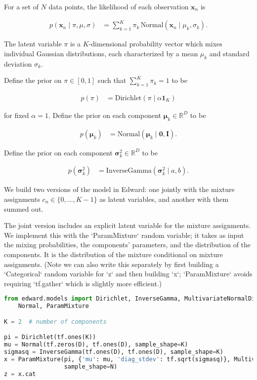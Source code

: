 For a set of $N$ data points,
the likelihood of each observation $\mathbf{x}_n$ is

\begin{align*}
  p(\mathbf{x}_n \mid \pi, \mu, \sigma)
  &=
  \sum_{k=1}^K \pi_k \, \text{Normal}(\mathbf{x}_n \mid \mu_k, \sigma_k).
\end{align*}

The latent variable $\pi$ is a $K$-dimensional probability vector
which mixes individual Gaussian distributions, each
characterized by a mean $\mu_k$ and standard deviation $\sigma_k$.

Define the prior on $\pi\in[0,1]$ such that $\sum_{k=1}^K\pi_k=1$ to be

\begin{align*}
  p(\pi)
  &=
  \text{Dirichlet}(\pi \mid \alpha \mathbf{1}_{K})
\end{align*}

for fixed $\alpha=1$. Define the prior on each component $\mathbf{\mu}_k\in\mathbb{R}^D$ to be

\begin{align*}
  p(\mathbf{\mu}_k)
  &=
  \text{Normal}(\mathbf{\mu}_k \mid \mathbf{0}, \mathbf{I}).
\end{align*}

Define the prior on each component $\mathbf{\sigma}_k^2\in\mathbb{R}^D$ to be

\begin{align*}
  p(\mathbf{\sigma}_k^2)
  &=
  \text{InverseGamma}(\mathbf{\sigma}_k^2 \mid a, b).
\end{align*}

We build two versions of the model in Edward: one jointly with the
mixture assignments $c_n\in\{0,\ldots,K-1\}$ as latent variables,
and another with them summed out.

The joint version includes an explicit latent variable for the mixture
assignments. We implement this with the `ParamMixture` random
variable; it takes as input the mixing probabilities, the components'
parameters, and the distribution of the components. It is the
distribution of the mixture conditional on mixture assignments. (Note
we can also write this separately by first building a `Categorical`
random variable for `z` and then building `x`; `ParamMixture` avoids
requiring `tf.gather` which is slightly more efficient.)

\begin{lstlisting}[language=Python]
from edward.models import Dirichlet, InverseGamma, MultivariateNormalDiag, \
    Normal, ParamMixture

K = 2  # number of components

pi = Dirichlet(tf.ones(K))
mu = Normal(tf.zeros(D), tf.ones(D), sample_shape=K)
sigmasq = InverseGamma(tf.ones(D), tf.ones(D), sample_shape=K)
x = ParamMixture(pi, {'mu': mu, 'diag_stdev': tf.sqrt(sigmasq)}, MultivariateNormalDiag,
                 sample_shape=N)
z = x.cat
\end{lstlisting}

